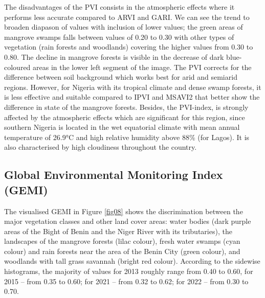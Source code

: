 \documentclass[jmse,article,submit,pdftex,moreauthors]{Definitions/mdpi}
\begin{document}
The disadvantages of the PVI consists in the atmospheric effects where it performs less accurate compared to ARVI and GARI. We can see the trend to broaden diapason of values with inclusion of lower values; the green areas of mangrove swamps falls between values of 0.20 to 0.30 with other types of vegetation (rain forests and woodlands) covering the higher values from 0.30 to 0.80. The decline in mangrove forests is visible in the decrease of dark blue-coloured areas in the lower left segment of the image. The PVI corrects for the difference between soil background which works best for arid and semiarid regions. However, for Nigeria with its tropical climate and dense swamp forests, it is less effective and suitable compared to IPVI and MSAVI2 that better show the difference in state of the mangrove forests. Besides, the PVI-index, is strongly affected by the atmospheric effects which are significant for this region, since southern Nigeria is located in the wet equatorial climate with mean annual temperature of 26.9°C and high relative humidity above 88\% (for Lagos). It is also characterised by high cloudiness throughout the country. 

\subsection{Global Environmental Monitoring Index (GEMI)}

The visualised GEMI in Figure \ref{fig08} shows the discrimination between the major vegetation classes and other land cover areas: water bodies (dark purple areas of the Bight of Benin and the Niger River with its tributaries), the landscapes of the mangrove forests (lilac colour), fresh water swamps (cyan colour) and rain forests near the area of the Benin City (green colour), and woodlands with tall grass savannah (bright red colour). According to the sidewise histograms, the majority of values for 2013 roughly range from 0.40 to 0.60, for 2015 -- from 0.35 to 0.60; for 2021 -- from 0.32 to 0.62; for 2022 -- from 0.30 to 0.70. 
\end{document}

